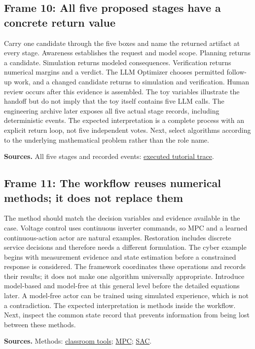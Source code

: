 \documentclass[11pt]{article}
\begin{document}
\subsection*{Frame 10: All five proposed stages have a concrete return value}
Carry one candidate through the five boxes and name the returned artifact at every stage. Awareness establishes the request and model scope. Planning returns a candidate. Simulation returns modeled consequences. Verification returns numerical margins and a verdict. The LLM Optimizer chooses permitted follow-up work, and a changed candidate returns to simulation and verification. Human review occurs after this evidence is assembled. The toy variables illustrate the handoff but do not imply that the toy itself contains five LLM calls. The engineering archive later exposes all five actual stage records, including deterministic events. The expected interpretation is a complete process with an explicit return loop, not five independent votes. Next, select algorithms according to the underlying mathematical problem rather than the role name.\par
\par\nopagebreak\begin{minipage}{\linewidth}{\footnotesize\color{slate}\textbf{Sources.} All five stages and recorded events: \href{../results/proposal_complete_workflow.json}{executed tutorial trace}.\par}\end{minipage}\par\medskip
\subsection*{Frame 11: The workflow reuses numerical methods; it does not replace them}
The method should match the decision variables and evidence available in the case. Voltage control uses continuous inverter commands, so MPC and a learned continuous-action actor are natural examples. Restoration includes discrete service decisions and therefore needs a different formulation. The cyber example begins with measurement evidence and state estimation before a constrained response is considered. The framework coordinates these operations and records their results; it does not make one algorithm universally appropriate. Introduce model-based and model-free at this general level before the detailed equations later. A model-free actor can be trained using simulated experience, which is not a contradiction. The expected interpretation is methods inside the workflow. Next, inspect the common state record that prevents information from being lost between these methods.\par
\par\nopagebreak\begin{minipage}{\linewidth}{\footnotesize\color{slate}\textbf{Sources.} Methods: \href{../src/classroom_labs.py}{classroom tools}; \href{https://sites.engineering.ucsb.edu/~jbraw/mpc/}{MPC}; \href{https://proceedings.mlr.press/v80/haarnoja18b.html}{SAC}.\par}\end{minipage}\par\medskip
\end{document}
